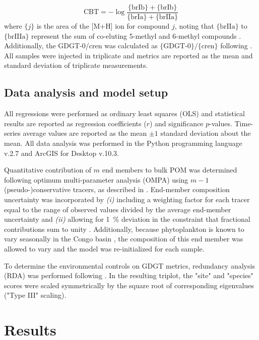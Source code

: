 \begin{equation}\label{Ch5Eq:3}
	\text{CBT} = -\log \frac{\{\text{brIb}\} + \{\text{brIb}\}}{\{\text{brIa}\} + \{\text{brIIa}\}}
\end{equation}
%
where $\{j\}$ is the area of the [M+H]\super{+} ion for compound $j$, noting that $\{\text{brIIa}\}$ to $\{\text{brIIIa}\}$ represent the sum of co-eluting 5-methyl and 6-methyl compounds \citep{DeJonge:2014kw}. Additionally, the GDGT-0/cren was calculated as $\{\text{GDGT-0}\}/\{\text{cren}\}$ following \citet{Blaga:2009ge}. All samples were injected in triplicate and metrics are reported as the mean and standard deviation of triplicate measurements.

\subsection{Data analysis and model setup}

All regressions were performed as ordinary least squares (OLS) and statistical results are reported as regression coefficients ($r$) and significance $p$-values. Time-series average values are reported as the mean $\pm 1$ standard deviation about the mean. All data analysis was performed in the Python programming language v.2.7 and ArcGIS for Desktop v.10.3.

Quantitative contribution of $m$ end members to bulk POM was determined following optimum multi-parameter analysis (OMPA) using $m-1$ (pseudo-)conservative tracers, as described in \citet{Glover:2011uh}. End-member composition uncertainty was incorporated by \textit{(i)} including a weighting factor for each tracer equal to the range of observed values divided by the average end-member uncertainty and \textit{(ii)} allowing for \SI{1}{\%} deviation in the constraint that fractional contributions sum to unity \citep{Glover:2011uh}. Additionally, because phytoplankton  is known to vary seasonally in the Congo basin \citep{Bouillon:2014ko}, the composition of this end member was allowed to vary and the model was re-initialized for each sample.

To determine the environmental controls on GDGT metrics, redundancy analysis (RDA) was performed following \citet{Legendre:1998tt}. In the resulting triplot, the "site" and "species" scores were scaled symmetrically by the square root of corresponding eigenvalues ("Type III" scaling).

\section{Results}

